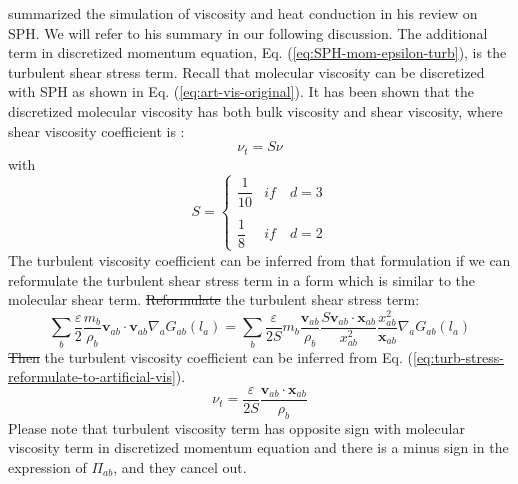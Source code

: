 \documentclass[gmd, manuscript]{copernicus} %
\providecommand{\DIFadd}[1]{{\protect\color{blue}\uwave{#1}}} %
\providecommand{\DIFdel}[1]{{\protect\color{red}\sout{#1}}}                      %
\providecommand{\DIFaddbegin}{} %
\providecommand{\DIFaddend}{} %
\providecommand{\DIFdelbegin}{} %
\providecommand{\DIFdelend}{} %
\begin{document}
\citet{monaghan2005smoothed} summarized the simulation of viscosity and heat conduction in his review on SPH. We will refer to his summary in our following discussion. The additional term in discretized momentum equation, Eq. (\ref{eq:SPH-mom-epsilon-turb}), is the turbulent shear stress term. 
Recall that molecular viscosity can be discretized with SPH as shown in Eq. (\ref{eq:art-vis-original}). 
It has been shown that the discretized molecular viscosity has both bulk viscosity and shear viscosity, where shear viscosity coefficient is \citep{monaghan2005smoothed}:
\begin{equation}
\nu_t = S \nu
\end{equation}
with
\begin{equation}
S= 
\begin{cases} 
      \dfrac{1}{10} & if  \quad d=3 \\
      \\
     \dfrac{1}{8}  & if  \quad d=2 
\end{cases}
\end{equation}
The turbulent viscosity coefficient can be inferred from that formulation if we can reformulate the turbulent shear stress term in a form which is similar to the molecular shear term.
\DIFdelbegin \DIFdel{Reformulate }\DIFdelend \DIFaddbegin \DIFadd{Reformulating }\DIFaddend the turbulent shear stress term:
\begin{equation}
\label{eq:turb-stress-reformulate-to-artificial-vis}
 \sum_b \dfrac{\varepsilon}{2} \dfrac{m_b}{\rho_b} \textbf{v}_{ab} \cdot \textbf{v}_{ab} \nabla_a G_{ab}\left(l_a\right)= \sum_b \dfrac{\varepsilon}{2S} m_b \dfrac{\textbf{v}_{ab}}{\rho_b} \dfrac{S \textbf{v}_{ab} \cdot \textbf{x}_{ab}}{x_{ab}^2} \dfrac{x_{ab}^2}{\textbf{x}_{ab}} \nabla_a G_{ab}\left(l_a\right) 
\end{equation}
\DIFdelbegin \DIFdel{Then }\DIFdelend \DIFaddbegin \DIFadd{then }\DIFaddend the turbulent viscosity coefficient can be inferred from Eq. (\ref{eq:turb-stress-reformulate-to-artificial-vis}).
\begin{equation}
\nu_t = \dfrac{\varepsilon}{2S} \dfrac{\textbf{v}_{ab} \cdot \textbf{x}_{ab}}{\rho_b}
\end{equation}
Please note that turbulent viscosity term has opposite sign with molecular viscosity term in discretized momentum equation and there is a minus sign in the expression of $\Pi_{ab}$, and they cancel out.
\end{document}
